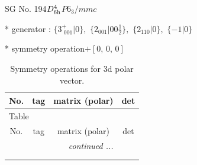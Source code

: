 \documentclass[fleqn,8pt]{jsarticle}
\begin{document}
\setcounter{MaxMatrixCols}{32}

\renewcommand{\tablename}{Table~}
\renewcommand{\figurename}{Figure~}
\begin{center}
\LARGE
SG No. 194\quad$D_{\rm 6h}^{4}$\quad$P6_3/mmc$\quad[ hexagonal ]
\end{center}

* generator : $\{3^{+}_{\,\,001}|0\},\,\,\{2{}_{001}|0 0 \frac{1}{2}\},\,\,\{2{}_{110}|0\},\,\,\{-1|0\}$

* symmetry operation\quad$+\left[ 0,\, 0,\, 0 \right]$
\renewcommand{\arraystretch}{1.3}
\begin{longtable}{cccc}
\caption{Symmetry operations for 3d polar vector.}
 \\
 \hline \hline
No. & tag & matrix (polar) & det \\ \hline \endfirsthead

\multicolumn{3}{l}{\tablename\ \thetable{}} \\
 \hline \hline
No. & tag & matrix (polar) & det \\ \hline \endhead

 \hline \hline
\multicolumn{3}{r}{\footnotesize\it continued ...} \\ \endfoot

 \hline \hline
\multicolumn{3}{r}{} \\ \endlastfoot


\end{longtable}
\end{document}
